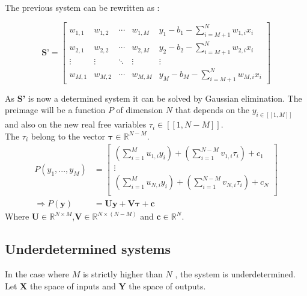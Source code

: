 \documentclass{article}
\begin{document}
    The previous system can be rewritten as : 

    \begin{equation*}
        \textbf{S'}= \left[\begin{array}{cccc|c}  
        w_{1,1} & w_{1,2} & \cdots & w_{1,M} & y_{1}-b_{1} - \sum_{i=M+1}^{N} w_{1,i}x_{i}\\
        w_{2,1} & w_{2,2} & \cdots & w_{2,M} & y_{2}-b_{2} - \sum_{i=M+1}^{N} w_{2,i}x_{i}\\
        \vdots  & \vdots  & \ddots & \vdots & \vdots\\
        w_{M,1} & w_{M,2} & \cdots & w_{M,M} & y_{M}-b_{M} - \sum_{i=M+1}^{N} w_{M,i}x_{i}
       \end{array}\right]
    \end{equation*}

    As \textbf{S'} is now a determined system it can be solved by Gaussian elimination.
    The preimage will be a function $P$ of dimension $N$ that depends on the $y_{i \in [\![1,M]\!]}$ 
    and also on the new real free variables $\tau_{i} \in [\![1,N-M]\!]$.\\
    The $\tau_{i}$ belong to the vector $\boldsymbol{\tau} \in \mathbb{R}^{N-M}$.
    \begin{equation*}
    \begin{split}
        P(y_{1},...,y_{M}) &= 
        \begin{bmatrix}
            (\sum_{i=1}^{M} u_{1,i}y_{i})+ (\sum_{i=1}^{N-M} v_{1,i}\tau_{i})  + c_{1}\\
            \vdots \\
            (\sum_{i=1}^{M} u_{N,i}y_{i})+ (\sum_{i=1}^{N-M} v_{N,i}\tau_{i})  + c_{N}\\
        \end{bmatrix}\\
        \Rightarrow P(\textbf{y})&= \textbf{Uy} + \textbf{V}\boldsymbol{\tau}+ \textbf{c}
    \end{split}
    \end{equation*}
    Where $\textbf{U} \in  \mathbb{R}^{N \times M}$,$\textbf{V} \in  \mathbb{R}^{N \times (N-M)}$ and $\textbf{c} \in \mathbb{R}^{N}.$

\subsection{Underdetermined systems}

In the case where $M$ is strictly higher than $N$ , the system is underdetermined.\\
Let $\mathbf{X}$ the space of inputs and $\mathbf{Y}$ the space of outputs.
\end{document}
